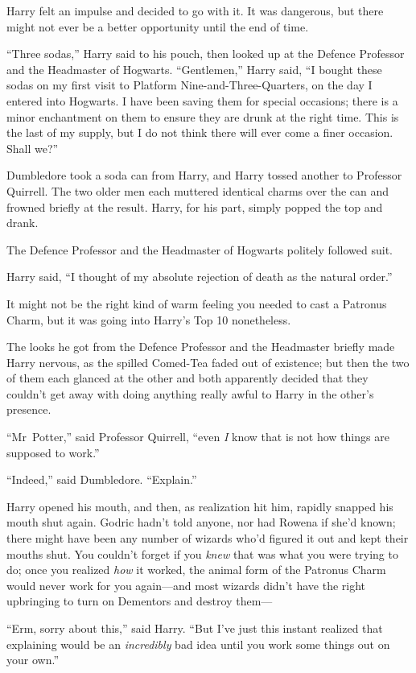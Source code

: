 Harry felt an impulse and decided to go with it. It was dangerous, but there might not ever be a better opportunity until the end of time.

“Three sodas,” Harry said to his pouch, then looked up at the Defence Professor and the Headmaster of Hogwarts.
“Gentlemen,” Harry said,
“I bought these sodas on my first visit to Platform Nine-and-Three-Quarters, on the day I entered into Hogwarts. I have been saving them for special occasions; there is a minor enchantment on them to ensure they are drunk at the right time. This is the last of my supply, but I do not think there will ever come a finer occasion. Shall we?”

Dumbledore took a soda can from Harry, and Harry tossed another to Professor Quirrell. The two older men each muttered identical charms over the can and frowned briefly at the result. Harry, for his part, simply popped the top and drank.

The Defence Professor and the Headmaster of Hogwarts politely followed suit.

Harry said,
“I thought of my absolute rejection of death as the natural order.”

It might not be the right kind of warm feeling you needed to cast a Patronus Charm, but it was going into Harry’s Top 10 nonetheless.

The looks he got from the Defence Professor and the Headmaster briefly made Harry nervous, as the spilled Comed-Tea faded out of existence; but then the two of them each glanced at the other and both apparently decided that they couldn’t get away with doing anything really awful to Harry in the other’s presence.

“Mr~Potter,” said Professor Quirrell, “even \emph{I} know that is not how things are supposed to work.”

“Indeed,” said Dumbledore.
“Explain.”

Harry opened his mouth, and then, as realization hit him, rapidly snapped his mouth shut again. Godric hadn’t told anyone, nor had Rowena if she’d known; there might have been any number of wizards who’d figured it out and kept their mouths shut. You couldn’t forget if you \emph{knew} that was what you were trying to do; once you realized \emph{how} it worked, the animal form of the Patronus Charm would never work for you again—and most wizards didn’t have the right upbringing to turn on Dementors and destroy them—

“Erm, sorry about this,” said Harry.
“But I’ve just this instant realized that explaining would be an \emph{incredibly} bad idea until you work some things out on your own.”

